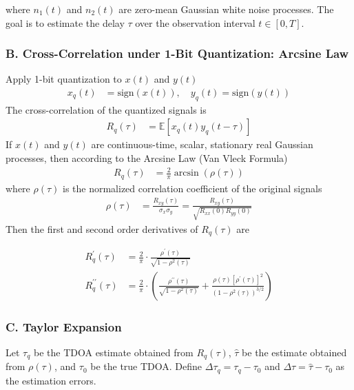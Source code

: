 \documentclass{article}
\begin{document}
	where $n_1(t)$ and $n_2(t)$ are zero-mean Gaussian white noise processes. The goal is to estimate the delay $\tau$ over the observation interval $t \in [0, T]$.
	
	\subsubsection*{B. Cross-Correlation under 1-Bit Quantization: Arcsine Law}
	Apply 1-bit quantization to $x(t)$ and $y(t)$
	\begin{align}
		x_q(t) &= \text{sign}(x(t)), \quad y_q(t) = \text{sign}(y(t)) 
	\end{align}
	The cross-correlation of the quantized signals is
	\begin{align}
		R_q(\tau) &= \mathbb{E}[x_q(t)y_q(t - \tau)] 
	\end{align}
	If $x(t)$ and $y(t)$ are continuous-time, scalar, stationary real Gaussian processes, then according to the Arcsine Law (Van Vleck Formula)
	\begin{align}
		R_q(\tau) &= \frac{2}{\pi} \arcsin(\rho(\tau)) 
	\end{align}
	where $\rho(\tau)$ is the normalized correlation coefficient of the original signals
	\begin{align}
		\rho(\tau) &= \frac{R_{xy}(\tau)}{\sigma_x\sigma_y} = \frac{R_{xy}(\tau)}{\sqrt{R_{xx}(0)R_{yy}(0)}} 
	\end{align}
	Then the first and second order derivatives of $R_q(\tau)$ are
	
	\begin{align}
		R_{q}^{\prime}(\tau)&=\frac{2}{\pi} \cdot \frac{\rho^{\prime}(\tau)}{\sqrt{1-\rho^{2}(\tau)}} \\
		R_{q}^{\prime \prime}(\tau)&=\frac{2}{\pi} \cdot\left(\frac{\rho^{\prime \prime}(\tau)}{\sqrt{1-\rho^{2}(\tau)}}+\frac{\rho(\tau)\left[\rho^{\prime}(\tau)\right]^{2}}{\left(1-\rho^{2}(\tau)\right)^{3 / 2}}\right)
	\end{align}
	
	\subsubsection*{C. Taylor Expansion}
	Let $\tau_q$ be the TDOA estimate obtained from $R_q(\tau)$, $\hat{\tau}$ be the estimate obtained from $\rho(\tau)$, and $\tau_0$ be the true TDOA. Define $\Delta\tau_q = \tau_q - \tau_0$ and $\Delta\tau = \hat{\tau} - \tau_0$ as the estimation errors.
	
\end{document}
